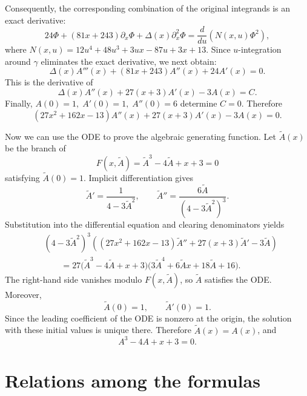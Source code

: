 \documentclass[11pt,fleqn]{article}
\theoremstyle{plain}
\begin{document}
	Consequently, the corresponding combination of the original integrands
	is an exact derivative:
	\[
	24\Phi+(81x+243)\partial_x\Phi
	+\Delta(x)\partial_x^2\Phi
	=
	\frac{d}{du}
	\left(
	N(x,u)\Phi^2
	\right),
	\]
	where $N(x,u)=12u^4+48u^3+3ux-87u+3x+13.$ Since $u$-integration around $\gamma$ 
	eliminates the exact derivative, we next obtain:
	\[
	\Delta(x)A'''(x)
	+(81x+243)A''(x)
	+24A'(x)=0.
	\]
	This is the derivative of
	\[
	\Delta(x)A''(x)
	+27(x+3)A'(x)
	-3A(x)=C.
	\]
	Finally, $A(0)=1, \; A'(0)=1, \; A''(0)=6$ determine $C=0$. Therefore
	\[
	(27x^2+162x-13)A''(x)
	+27(x+3)A'(x)
	-3A(x)=0.
	\]
	
	
	
	\medskip
	
	Now we can use the ODE to prove the algebraic generating function. Let
	$\widetilde A(x)$ be the branch of
	\[
	F(x,\widetilde A)=\widetilde A^3-4\widetilde A+x+3=0
	\]
	satisfying $\widetilde A(0)=1$. Implicit differentiation gives
	\[
	\widetilde A'=\frac{1}{4-3\widetilde A^2},
	\qquad
	\widetilde A''=\frac{6\widetilde A}{(4-3\widetilde A^2)^3}.
	\]
	Substitution into the differential equation and clearing denominators yields
	\[
	\begin{aligned}
		&(4-3\widetilde A^2)^3
		\left(
		(27x^2+162x-13)\widetilde A''
		+27(x+3)\widetilde A'
		-3\widetilde A
		\right)\\
		&\qquad=
		27\bigl(\widetilde A^3-4\widetilde A+x+3\bigr)
		\bigl(3\widetilde A^4+6\widetilde A x
		+18\widetilde A+16\bigr).
	\end{aligned}
	\]
	The right-hand side vanishes modulo $F(x,\widetilde A)$, so
	$\widetilde A$ satisfies the ODE. Moreover,
	\[
	\widetilde A(0)=1,
	\qquad
	\widetilde A'(0)=1.
	\]
	Since the leading coefficient of the ODE is nonzero at the origin, the
	solution with these initial values is unique there. Therefore
	$\widetilde A(x)=A(x)$, and
	\[
	A^3-4A+x+3=0.
	\]  
	
	
	\clearpage
\section{Relations among the formulas}
\end{document}
